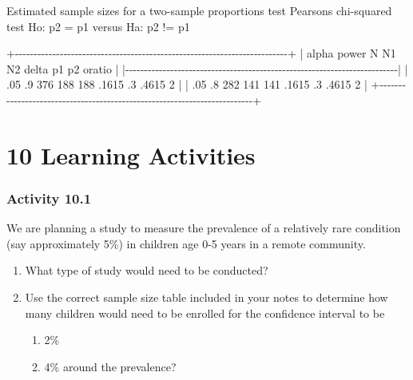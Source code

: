 \documentclass[
]{memoir}
\newenvironment{Shaded}{\begin{snugshade}}{\end{snugshade}}
\newcommand{\NormalTok}[1]{#1}
\providecommand{\tightlist}{%
  \setlength{\itemsep}{0pt}\setlength{\parskip}{0pt}}
\begin{document}
\begin{Shaded}
\begin{Highlighting}[]
\NormalTok{Estimated sample sizes for a two{-}sample proportions test}
\NormalTok{Pearson\textquotesingle{}s chi{-}squared test }
\NormalTok{Ho: p2 = p1  versus  Ha: p2 != p1}

\NormalTok{  +{-}{-}{-}{-}{-}{-}{-}{-}{-}{-}{-}{-}{-}{-}{-}{-}{-}{-}{-}{-}{-}{-}{-}{-}{-}{-}{-}{-}{-}{-}{-}{-}{-}{-}{-}{-}{-}{-}{-}{-}{-}{-}{-}{-}{-}{-}{-}{-}{-}{-}{-}{-}{-}{-}{-}{-}{-}{-}{-}{-}{-}{-}{-}{-}{-}{-}{-}{-}{-}{-}{-}{-}{-}+}
\NormalTok{  |   alpha   power       N      N1      N2   delta      p1      p2  oratio |}
\NormalTok{  |{-}{-}{-}{-}{-}{-}{-}{-}{-}{-}{-}{-}{-}{-}{-}{-}{-}{-}{-}{-}{-}{-}{-}{-}{-}{-}{-}{-}{-}{-}{-}{-}{-}{-}{-}{-}{-}{-}{-}{-}{-}{-}{-}{-}{-}{-}{-}{-}{-}{-}{-}{-}{-}{-}{-}{-}{-}{-}{-}{-}{-}{-}{-}{-}{-}{-}{-}{-}{-}{-}{-}{-}{-}|}
\NormalTok{  |     .05      .9     376     188     188   .1615      .3   .4615       2 |}
\NormalTok{  |     .05      .8     282     141     141   .1615      .3   .4615       2 |}
\NormalTok{  +{-}{-}{-}{-}{-}{-}{-}{-}{-}{-}{-}{-}{-}{-}{-}{-}{-}{-}{-}{-}{-}{-}{-}{-}{-}{-}{-}{-}{-}{-}{-}{-}{-}{-}{-}{-}{-}{-}{-}{-}{-}{-}{-}{-}{-}{-}{-}{-}{-}{-}{-}{-}{-}{-}{-}{-}{-}{-}{-}{-}{-}{-}{-}{-}{-}{-}{-}{-}{-}{-}{-}{-}{-}+}
\end{Highlighting}
\end{Shaded}

\hypertarget{learning-activities-9}{%
\chapter*{\texorpdfstring{\textbf{10} Learning Activities}{10 Learning Activities}}\label{learning-activities-9}}

\hypertarget{activity-10.1}{%
\subsection*{Activity 10.1}\label{activity-10.1}}

We are planning a study to measure the prevalence of a relatively rare condition (say approximately 5\%) in children age 0-5 years in a remote community.

\begin{enumerate}
\def\labelenumi{\alph{enumi})}
\tightlist
\item
  What type of study would need to be conducted?
\item
  Use the correct sample size table included in your notes to determine how many children would need to be enrolled for the confidence interval to be

  \begin{enumerate}
  \def\labelenumii{\roman{enumii}.}
  \tightlist
  \item
    2\%
  \item
    4\% around the prevalence?
  \end{enumerate}
\end{enumerate}
\end{document}
